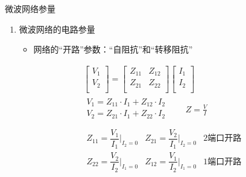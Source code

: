 \begin{frame}{微波网络参量}
    \begin{enumerate}
        \item 微波网络的电路参量
              \begin{itemize}
                  \item 网络的“开路”参数：“自阻抗”和“转移阻抗”
              \end{itemize}
              \begin{gather*}
                  \begin{bmatrix*}
                      V_1\\
                      V_2\\
                  \end{bmatrix*}
                  =
                  \begin{bmatrix*}
                      Z_{11} & Z_{12}\\
                      Z_{21} & Z_{22}\\
                  \end{bmatrix*}
                  \begin{bmatrix*}
                      I_1 \\
                      I_2 \\
                  \end{bmatrix*}\\
                  \begin{matrix*}
                      V_1=Z_{11}\cdot I_1+Z_{12}\cdot I_2\\
                      V_2=Z_{21}\cdot I_1+Z_{22}\cdot I_2\\
                  \end{matrix*}
                  \qquad Z=\frac{V}{I}\\
                  \begin{matrix*}
                      Z_{11}=\dfrac{V_1}{I_1}\bigg|_{I_2=0} & Z_{21}=\dfrac{V_2}{I_1}\bigg|_{I_2=0} & 2端口开路 \\
                      Z_{22}=\dfrac{V_2}{I_2}\bigg|_{I_1=0} & Z_{12}=\dfrac{V_1}{I_2}\bigg|_{I_1=0} & 1端口开路 \\
                  \end{matrix*}
              \end{gather*}
    \end{enumerate}
\end{frame}

